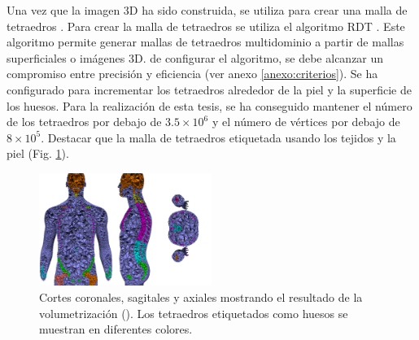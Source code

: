 Una vez que la imagen 3D ha sido construida, se utiliza para crear una malla de tetraedros . 
Para crear la malla de tetraedros se utiliza el algoritmo \ac{RDT} \cite{jamin:hal-00796052}. Este algoritmo permite generar mallas de tetraedros multidominio  a partir de mallas superficiales o imágenes 3D.  de configurar el algoritmo, se debe alcanzar un compromiso entre precisión y eficiencia (ver anexo \ref{anexo:criterios}). Se ha configurado para incrementar los tetraedros alrededor de la piel y la superficie de los huesos. Para la realización de esta tesis, se ha conseguido mantener el número de los tetraedros por debajo de $3.5\times 10^6$ y el número de vértices por debajo de $8 \times 10^5$. Destacar que la malla de tetraedros  etiquetada usando los tejidos  y la piel (Fig. \ref{fig:tetra}).
%
\begin{figure}[th]
   \centering
    \includegraphics[width=0.5\textwidth]{IMG/boneid.png}
     \caption{Cortes coronales, sagitales y axiales mostrando el resultado de la volumetrización (). Los tetraedros etiquetados como huesos se muestran en diferentes colores.}
\label{fig:tetra}
\end{figure} 

